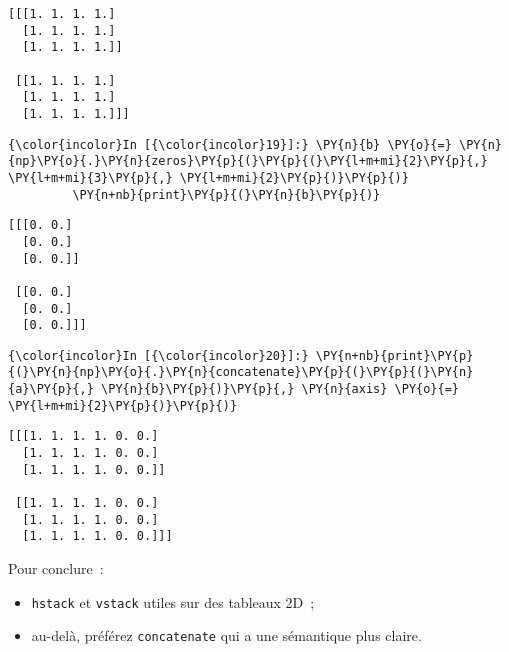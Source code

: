     \begin{Verbatim}[commandchars=\\\{\},frame=single,framerule=0.3mm,rulecolor=\color{cellframecolor}]
[[[1. 1. 1. 1.]
  [1. 1. 1. 1.]
  [1. 1. 1. 1.]]

 [[1. 1. 1. 1.]
  [1. 1. 1. 1.]
  [1. 1. 1. 1.]]]
\end{Verbatim}

    \begin{Verbatim}[commandchars=\\\{\},frame=single,framerule=0.3mm,rulecolor=\color{cellframecolor}]
{\color{incolor}In [{\color{incolor}19}]:} \PY{n}{b} \PY{o}{=} \PY{n}{np}\PY{o}{.}\PY{n}{zeros}\PY{p}{(}\PY{p}{(}\PY{l+m+mi}{2}\PY{p}{,} \PY{l+m+mi}{3}\PY{p}{,} \PY{l+m+mi}{2}\PY{p}{)}\PY{p}{)}
         \PY{n+nb}{print}\PY{p}{(}\PY{n}{b}\PY{p}{)}
\end{Verbatim}


    \begin{Verbatim}[commandchars=\\\{\},frame=single,framerule=0.3mm,rulecolor=\color{cellframecolor}]
[[[0. 0.]
  [0. 0.]
  [0. 0.]]

 [[0. 0.]
  [0. 0.]
  [0. 0.]]]
\end{Verbatim}

    \begin{Verbatim}[commandchars=\\\{\},frame=single,framerule=0.3mm,rulecolor=\color{cellframecolor}]
{\color{incolor}In [{\color{incolor}20}]:} \PY{n+nb}{print}\PY{p}{(}\PY{n}{np}\PY{o}{.}\PY{n}{concatenate}\PY{p}{(}\PY{p}{(}\PY{n}{a}\PY{p}{,} \PY{n}{b}\PY{p}{)}\PY{p}{,} \PY{n}{axis} \PY{o}{=} \PY{l+m+mi}{2}\PY{p}{)}\PY{p}{)}
\end{Verbatim}


    \begin{Verbatim}[commandchars=\\\{\},frame=single,framerule=0.3mm,rulecolor=\color{cellframecolor}]
[[[1. 1. 1. 1. 0. 0.]
  [1. 1. 1. 1. 0. 0.]
  [1. 1. 1. 1. 0. 0.]]

 [[1. 1. 1. 1. 0. 0.]
  [1. 1. 1. 1. 0. 0.]
  [1. 1. 1. 1. 0. 0.]]]
\end{Verbatim}

    Pour conclure~:

\begin{itemize}
\tightlist
\item
  \texttt{hstack} et \texttt{vstack} utiles sur des tableaux 2D~;
\item
  au-delà, préférez \texttt{concatenate} qui a une sémantique plus
  claire.
\end{itemize}

